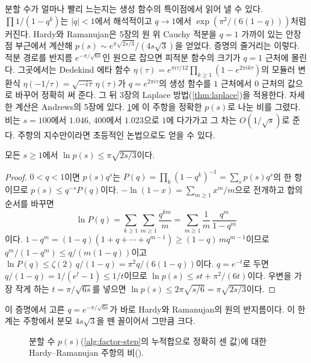 분할 수가 얼마나 빨리 느는지는 생성 함수의 특이점에서 읽어 낼 수 있다. $\prod1/(1-q^k)$는 $|q|<1$에서 해석적이고 $q\to1$에서 $\exp(\pi^2/(6(1-q)))$처럼 커진다. Hardy와 Ramanujan\cite{hardy1918}은 5장의 원 위 Cauchy 적분을 $q=1$ 가까이 있는 안장점 부근에서 계산해 $p(s)\sim e^{\pi\sqrt{2s/3}}/(4s\sqrt3)$을 얻었다. 증명의 줄거리는 이렇다. 적분 경로를 반지름 $e^{-\pi/\sqrt{6s}}$인 원으로 잡으면 피적분 함수의 크기가 $q=1$ 근처에 몰린다. 그곳에서는 Dedekind 에타 함수 $\eta(\tau)=e^{\pi i\tau/12}\prod_{k\ge1}(1-e^{2\pi ik\tau})$의 모듈러 변환식 $\eta(-1/\tau)=\sqrt{-i\tau}\,\eta(\tau)$가 $q=e^{2\pi i\tau}$의 생성 함수를 $1$ 근처에서 $0$ 근처의 값으로 바꾸어 정확히 써 준다. 그 뒤 3장의 Laplace 방법(\cref{thm:laplace})을 적용한다. 자세한 계산은 Andrews\cite{andrews1998partitions}의 5장에 있다. \cref{fig:partitions}에 이 주항을 정확한 $p(s)$로 나눈 비를 그렸다. 비는 $s=100$에서 $1.046$, $400$에서 $1.023$으로 $1$에 다가가고 그 차는 $O(1/\sqrt s)$로 준다. 주항의 지수만이라면 초등적인 논법으로도 얻을 수 있다.

\begin{proposition}
\label{prop:partition-bound}
모든 $s\ge1$에서 $\ln p(s)\le\pi\sqrt{2s/3}$이다.
\end{proposition}

\begin{proof}
$0<q<1$이면 $p(s)q^s$는 $P(q)=\prod_k(1-q^k)^{-1}=\sum_sp(s)q^s$의 한 항이므로 $p(s)\le q^{-s}P(q)$이다. $-\ln(1-x)=\sum_{m\ge1}x^m/m$으로 전개하고 합의 순서를 바꾸면
\[
\ln P(q)=\sum_{k\ge1}\sum_{m\ge1}\frac{q^{km}}m=\sum_{m\ge1}\frac1m\,\frac{q^m}{1-q^m}
\]
이다. $1-q^m=(1-q)(1+q+\cdots+q^{m-1})\ge(1-q)\,mq^{m-1}$이므로 $q^m/(1-q^m)\le q/(m(1-q))$이고 $\ln P(q)\le\zeta(2)\,q/(1-q)=\pi^2q/(6(1-q))$이다. $q=e^{-t}$로 두면 $q/(1-q)=1/(e^t-1)\le1/t$이므로 $\ln p(s)\le st+\pi^2/(6t)$이다. 우변을 가장 작게 하는 $t=\pi/\sqrt{6s}$를 넣으면 $\ln p(s)\le2\pi\sqrt{s/6}=\pi\sqrt{2s/3}$이다.
\end{proof}

이 증명에서 고른 $q=e^{-\pi/\sqrt{6s}}$가 바로 Hardy와 Ramanujan의 원의 반지름이다. 이 한계는 주항에서 분모 $4s\sqrt3$을 뗀 꼴이어서 그만큼 크다.

\begin{figure}[htbp]
\centering
{}
\caption{분할 수 $p(s)$(\cref{alg:factor-step}의 누적합으로 정확히 센 값)에 대한 Hardy--Ramanujan 주항의 비().}
\label{fig:partitions}
\end{figure}


